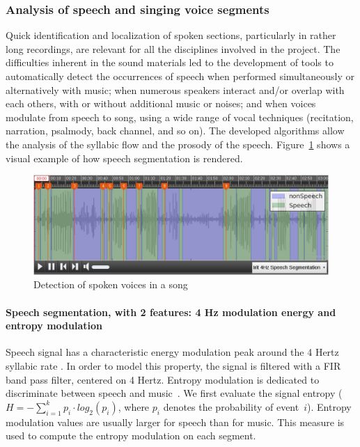 \documentclass{sig-alternate}
\newcommand{\squeezeup}{\vspace{-2.5mm}}
\begin{document}
\subsubsection{Analysis of speech and singing voice segments}
Quick identification and localization of spoken sections, particularly in rather long recordings, are relevant for all the disciplines involved in the project. The difficulties inherent in the sound materials led to the development of tools to automatically detect the occurrences of speech when performed simultaneously or alternatively with music; when numerous speakers interact and/or overlap with each others, with or without additional music or noises; and when voices modulate from speech to song, using a wide range of vocal techniques (recitation, narration, psalmody, back channel, and so on). The developed algorithms allow the analysis of the syllabic flow and the prosody of the speech. 
Figure~\ref{fig:speech_detection} shows a visual example of how speech segmentation is rendered.

\begin{figure}[htb]
  \centering
 \includegraphics[width=\linewidth]{img/IRIT_Speech4Hz.png} 
  \caption{Detection of spoken voices in a song}
  \label{fig:speech_detection}
\end{figure}

\squeezeup\paragraph{Speech segmentation, with 2 features: 4 Hz modulation energy and entropy modulation} 
Speech signal has a characteristic energy modulation peak around the 4 Hertz syllabic rate \cite{Houtgast1985}. In order to model this property, the signal is filtered with a FIR band pass filter, centered on 4 Hertz.
Entropy modulation is dedicated to discriminate between speech and music~\cite{Pinquier2003}. We first evaluate the signal entropy ($H=-\sum_{i=1}^{k}p_i\cdot log_2(p_i)$, where $p_i$ denotes the probability of event~$i$). Entropy modulation values are usually larger for speech than for music. This measure is used to compute the entropy modulation on each segment. 
\end{document}
